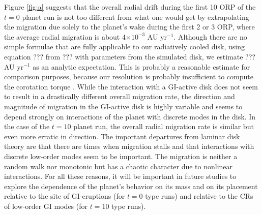 \documentclass[12pt,manuscript,authoryear]{aastex}
\begin{document}
Figure \ref{fig:a} suggests that the overall radial drift during the first 10 ORP of the $t = 0$ planet run is not too different from what one would get by extrapolating the migration due solely to the planet's wake during the first 2 or 3 ORP, where the average radial migration is about 4$\times10^{-3}$ AU yr$^{-1}$. Although there are no simple formulae that are fully applicable to our radiatively cooled disk, using equation ??? from ??? with parameters from the simulated disk, we estimate ??? AU yr$^{-1}$ as an analytic expectation. This is probably a reasonable estimate for comparison purposes, because our resolution is probably insufficient to compute the corotation torque \citep{paardekooper2010}. 
While the interaction with a GI-active disk does not seem to result in a drastically different overall migration rate, the direction and magnitude of migration in the GI-active disk is highly variable and seems to depend strongly on interactions of the planet with discrete modes in the disk. In the case of the $t = 10$ planet run, the overall radial migration rate is similar but even more erratic in direction. The important departures from laminar disk theory are that there are times when migration stalls and that interactions with discrete low-order modes seem to be important. The migration is neither a random walk nor monotonic but has a chaotic character due to nonlinear interactions. For all these reasons, it will be important in future studies to explore the dependence of the planet's behavior on its mass and on its placement relative to the site of GI-eruptions (for $t = 0$ type runs) and relative to the CRs of low-order GI modes (for $t = 10$ type runs).
\end{document}
